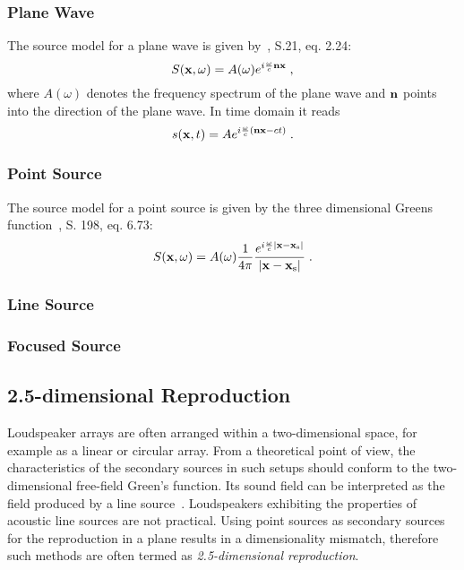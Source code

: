 \documentclass{article}
\begin{document}
\subsubsection{Plane Wave}
\label{sec:planewave}
The source model for a plane wave is given by~\cite{Williams1999}, S.21, eq. 2.24:
%
\begin{equation} 
    S(  \mathbf{x}  ,\omega) = A(\omega) e^{i\frac{\omega}{c}   \mathbf{n}     \mathbf{x}  }
    \;,
\end{equation}
%
where $A(\omega)$ denotes the frequency spectrum of the plane
wave and $  \mathbf{n}  $ points into the direction of the plane wave.
In time domain it reads
%
\begin{equation}
    s(  \mathbf{x}  ,t) = A e^{i\frac{\omega}{c} (  \mathbf{n}    \mathbf{x}  -ct)}
    \;.
\end{equation}

\subsubsection{Point Source}
\label{sec:pointsource}
The source model for a point source is given by the three dimensional Greens
function~\cite{Williams1999}, S. 198, eq. 6.73:
%
\begin{equation}
    S(  \mathbf{x}  ,\omega) = A(\omega) \frac{1}{4\pi}
    \frac{e^{i\frac{\omega}{c}|  \mathbf{x}  -  \mathbf{x}  _\text{s}|}}{|  \mathbf{x}  -  \mathbf{x}  _\text{s}|}
    \;.
\end{equation}

\subsubsection{Line Source}
\label{sec:linesource}

\subsubsection{Focused Source}
\label{sec:focsudedsource}

%
\subsection{2.5-dimensional Reproduction}%
\label{sec:25d_reproduction}%
%
Loudspeaker arrays are often arranged within a two-dimensional space, for example as a
linear or circular array. From a theoretical point of view, the characteristics of the
secondary sources in such setups should conform to the two-dimensional free-field Green's
function. Its sound field can be interpreted as the field produced by a line
source~\cite{Williams1999}. Loudspeakers exhibiting the
properties of acoustic line sources are not practical. Using point
sources as secondary sources for the reproduction in a plane results
in a dimensionality mismatch, therefore such methods are often
termed as {\em 2.5-dimensional reproduction}.
\end{document}
